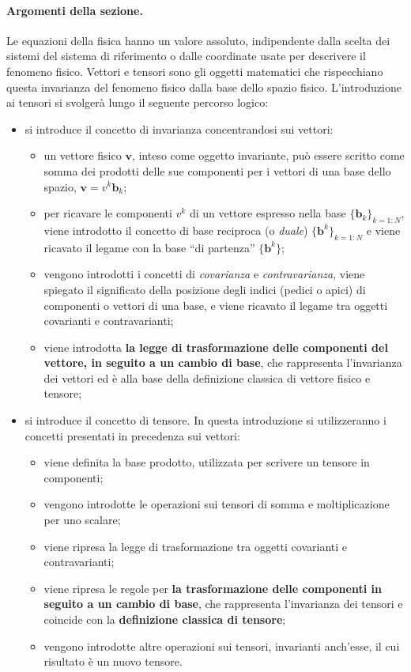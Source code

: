 \paragraph{Argomenti della sezione.} Le equazioni della fisica hanno un valore assoluto, indipendente dalla scelta dei sistemi del sistema di riferimento o dalle coordinate usate per descrivere il fenomeno fisico. Vettori e tensori sono gli oggetti matematici che rispecchiano questa invarianza del fenomeno fisico dalla base dello spazio fisico. L'introduzione ai tensori si svolgerà lungo il seguente percorso logico:
\begin{itemize}
 \item si introduce il concetto di invarianza concentrandosi sui vettori: 
\begin{itemize}
    \item un vettore fisico $\bm{v}$, inteso come oggetto invariante, può essere scritto come somma dei prodotti delle sue componenti per i vettori di una base dello spazio, $\bm{v} = v^k \bm{b}_k$;
 \item per ricavare le componenti $v^k$ di un vettore espresso nella base $\{ \bm{b}_k \}_{k=1:N}$, viene introdotto il concetto di base reciproca (o \textit{duale}) $\{ \bm{b}^k \}_{k=1:N}$ e viene ricavato il legame con la base ``di partenza'' $\{ \bm{b}^k \}$;
 \item vengono introdotti i concetti di \textit{covarianza} e \textit{contravarianza}, viene spiegato il significato della posizione degli indici (pedici o apici) di componenti o vettori di una base, e viene ricavato il legame tra oggetti covarianti e contravarianti;
 \item viene introdotta \textbf{la legge di trasformazione delle componenti del vettore, in seguito a un cambio di base}, che rappresenta l'invarianza dei vettori ed è alla base della definizione classica di vettore fisico e tensore;
\end{itemize}
 \item si introduce il concetto di tensore. In questa introduzione si utilizzeranno i concetti presentati in precedenza sui vettori:
 \begin{itemize}
  \item viene definita la base prodotto, utilizzata per scrivere un tensore in componenti;
  \item vengono introdotte le operazioni sui tensori di somma e moltiplicazione per uno scalare;
  \item viene ripresa la legge di trasformazione tra oggetti covarianti e contravarianti;
  \item viene ripresa le regole per \textbf{la trasformazione delle componenti in seguito a un cambio di base}, che rappresenta l'invarianza dei tensori e coincide con la \textbf{definizione classica di tensore};
  \item vengono introdotte altre operazioni sui tensori, invarianti anch'esse, il cui risultato è un nuovo tensore.
 \end{itemize}
\end{itemize}

